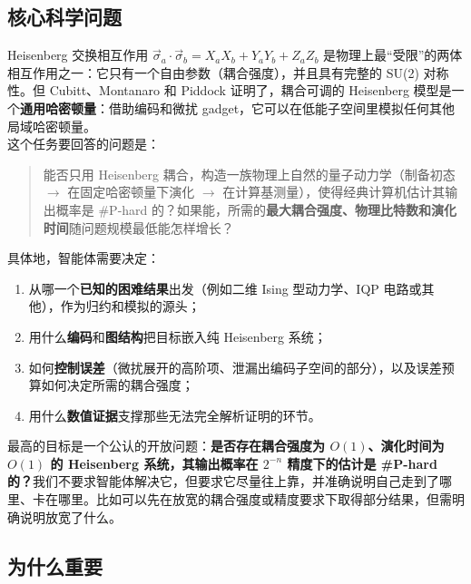 \documentclass[11pt,a4paper,fontset=none]{ctexart}
\newcommand{\Heis}{\vec\sigma_a\!\cdot\!\vec\sigma_b}
\begin{document}
\subsection{核心科学问题}

\noindent Heisenberg 交换相互作用 $\Heis = X_aX_b+Y_aY_b+Z_aZ_b$ 是物理上最“受限”的两体相互作用之一：它只有一个自由参数（耦合强度），并且具有完整的 SU(2) 对称性。但 Cubitt、Montanaro 和 Piddock 证明了，耦合可调的 Heisenberg 模型是一个\textbf{通用哈密顿量}\cite{CMP2018}：借助编码和微扰 gadget，它可以在低能子空间里模拟任何其他局域哈密顿量。\\
\noindent 这个任务要回答的问题是：

\begin{quote}
能否只用 Heisenberg 耦合，构造一族物理上自然的量子动力学（制备初态 $\to$ 在固定哈密顿量下演化 $\to$ 在计算基测量），使得经典计算机估计其输出概率是 \#P-hard 的？如果能，所需的\textbf{最大耦合强度、物理比特数和演化时间}随问题规模最低能怎样增长？
\end{quote}

\noindent 具体地，智能体需要决定：
\begin{enumerate}[label=(\arabic*)]
  \item 从哪一个\textbf{已知的困难结果}出发（例如二维 Ising 型动力学\cite{BV2018}、IQP 电路\cite{BMS2016}或其他），作为归约和模拟的源头；
  \item 用什么\textbf{编码}和\textbf{图结构}把目标嵌入纯 Heisenberg 系统；
  \item 如何\textbf{控制误差}（微扰展开的高阶项、泄漏出编码子空间的部分），以及误差预算如何决定所需的耦合强度；
  \item 用什么\textbf{数值证据}支撑那些无法完全解析证明的环节。
\end{enumerate}

\noindent 最高的目标是一个公认的开放问题：\textbf{是否存在耦合强度为 $O(1)$、演化时间为 $O(1)$ 的 Heisenberg 系统，其输出概率在 $2^{-n}$ 精度下的估计是 \#P-hard 的？}我们不要求智能体解决它，但要求它尽量往上靠，并准确说明自己走到了哪里、卡在哪里。比如可以先在放宽的耦合强度或精度要求下取得部分结果，但需明确说明放宽了什么。

\subsection{为什么重要}
\end{document}

